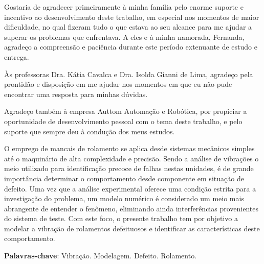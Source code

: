\imprimircapa
\imprimirfolhaderosto
\clearpage


\begin{agradecimentos}
	Gostaria de agradecer primeiramente à minha família pelo enorme suporte e incentivo ao desenvolvimento deste trabalho, em especial nos momentos de maior dificuldade, no qual fizeram tudo o que estava ao seu alcance para me ajudar a superar os problemas que enfrentava.
	A eles e à minha namorada, Fernanda, agradeço a compreensão e paciência durante este período extenuante de estudo e entrega.
	
	Às professoras Dra. Kátia Cavalca e Dra. Isolda Gianni de Lima, agradeço pela prontidão e disposição em me ajudar nos momentos em que eu não pude encontrar uma resposta para minhas dúvidas.
	
	Agradeço também à empresa Auttom Automação e Robótica, por propiciar a oportunidade de desenvolvimento pessoal com o tema deste trabalho, e pelo suporte que sempre deu à condução dos meus estudos.
\end{agradecimentos}

\begin{resumo}
	\SingleSpacing
	O emprego de mancais de rolamento se aplica desde sistemas mecânicos simples até o maquinário de alta complexidade e precisão.
	Sendo a análise de vibrações o meio utilizado para identificação precoce de falhas nestas unidades, é de grande importância determinar o comportamento desde componente em situação de defeito.
	Uma vez que a análise experimental oferece uma condição estrita para a investigação do problema, um modelo numérico é considerado um meio mais abrangente de entender o fenômeno, eliminando ainda interferências provenientes do sistema de teste.
	Com este foco, o presente trabalho tem por objetivo a modelar a vibração de rolamentos defeituosos e identificar as características deste comportamento.
	\vspace{\onelineskip}
	
	\noindent
	\textbf{Palavras-chave}: Vibração. Modelagem. Defeito. Rolamento.
\end{resumo}


